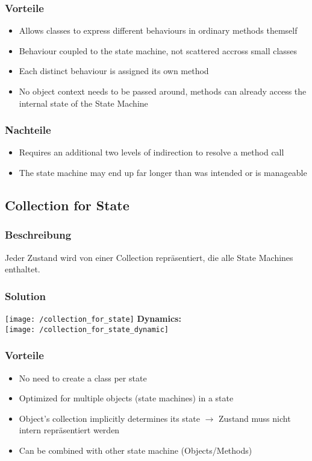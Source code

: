 \subsubsection{Vorteile}
\begin{itemize}[topsep=0pt]
    \itemsep -0.4em
    \item Allows classes to express different behaviours in ordinary methods themself
    \item Behaviour coupled to the state machine, not scattered accross small classes
    \item Each distinct behaviour is assigned its own method
    \item No object context needs to be passed around, methods can already access the internal state of the State Machine
\end{itemize}
\subsubsection{Nachteile}
\begin{itemize}[topsep=0pt]
    \itemsep -0.4em
    \item Requires an additional two levels of indirection to resolve a method call
    \item The state machine may end up far longer than was intended or is manageable
\end{itemize}

\subsection{Collection for State}
\subsubsection{Beschreibung}
Jeder Zustand wird von einer Collection repräsentiert, die alle State Machines enthaltet.
\subsubsection{Solution}
\texttt{[image: /collection\_for\_state]}
\textbf{Dynamics:}\\ 
\texttt{[image: /collection\_for\_state\_dynamic]}
\subsubsection{Vorteile}
\begin{itemize}[topsep=0pt]
    \itemsep -0.4em
    \item No need to create a class per state
    \item Optimized for multiple objects (state machines) in a state
    \item Object's collection implicitly determines its state $\rightarrow$ Zustand muss nicht intern repräsentiert werden
    \item Can be combined with other state machine (Objects/Methods)
\end{itemize}
